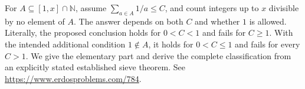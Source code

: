 For \(A\subseteq[1,x]\cap\mathbb N\), assume
\(\sum_{a\in A}1/a\leq C\), and count integers up to \(x\)
divisible by no element of \(A\).
The answer depends on both \(C\) and whether \(1\) is allowed.
Literally, the proposed conclusion holds for \(0<C<1\) and
fails for \(C\geq1\).
With the intended additional condition \(1\notin A\), it holds
for \(0<C\leq1\) and fails for every \(C>1\).
We give the elementary part and derive the complete classification
from an explicitly stated established sieve theorem.
See \url{https://www.erdosproblems.com/784}.
